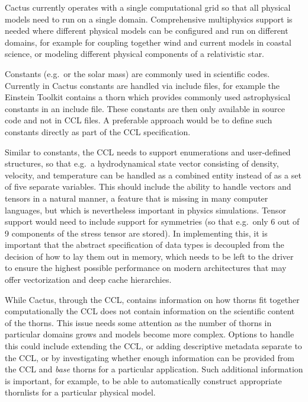 \documentclass[conference]{IEEEtran}
\begin{document}
Cactus currently operates with a single computational grid so that all physical models need to run on a single domain. Comprehensive multiphysics support is needed 
where different physical models can be configured and run on different domains, for example for coupling together wind and current models 
in coastal science, or modeling different physical components of a relativistic star. 
 
Constants (e.g.\  or the solar mass) are commonly used in
  scientific codes. Currently in Cactus constants are handled via
  include files, for example the Einstein Toolkit contains a thorn
  which provides commonly used astrophysical constants in an include
  file.  These constants are then only available in source code and
  not in CCL files.  A preferable approach would be to define such
  constants directly as part of the CCL specification.

Similar to constants, the CCL needs to support enumerations and
  user-defined structures, so that e.g.\ a hydrodynamical state vector
  consisting of density, velocity, and temperature can be handled as a
  combined entity instead of as a set of five separate variables.  This
  should include the ability to handle vectors and tensors in a
  natural manner, a feature that is missing in many computer
  languages, but which is nevertheless important in physics
  simulations.  Tensor support would need to include support for
  symmetries (so that e.g.\ only 6 out of 9 components of the stress tensor
  are stored).
  In implementing this, it is important that the abstract
  specification of data types is decoupled from the decision of how to
  lay them out in memory, which needs to be left to the driver to
  ensure the highest possible performance on modern architectures that
  may offer vectorization and deep cache hierarchies.

While Cactus, through the CCL, contains information on how thorns fit together computationally the CCL does not contain information on the scientific content of the thorns. This issue needs some attention as the number of thorns in particular domains grows and models become more complex. 
Options to handle this could include extending the CCL, or adding descriptive metadata separate to the CCL, or by investigating whether enough information can be provided from the CCL and {\it base} thorns for a particular application. Such additional information is important, for example, to be able to automatically construct appropriate thornlists for a particular physical model.
\end{document}
